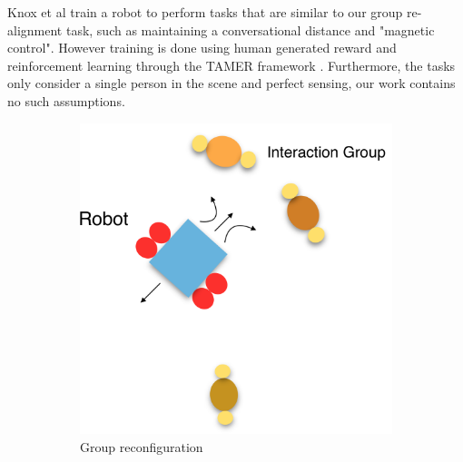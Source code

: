 \documentclass[letterpaper, 10 pt, conference]{ieeeconf}
\begin{document}
Knox et al \cite{knox2013training} train a robot to perform tasks that are similar to our group re-alignment task, such as maintaining a conversational distance and "magnetic control". However training is done using human generated reward and reinforcement learning through the TAMER framework \cite{knox2009interactively}. Furthermore, the tasks only consider a single person in the scene and perfect sensing, our work contains no such assumptions.

	\begin{figure}[tbh]
	\centering
      \begin{subfigure}[b]{0.39\columnwidth}
    \includegraphics[scale = 0.15]{images/static.png}
    \caption{Group reconfiguration}
    \label{fig:static}
  \end{subfigure}
  \hspace{10mm}
  \begin{subfigure}[b]{0.39\columnwidth}
  \hspace{4mm}

\end{subfigure}
\end{figure}
\end{document}
